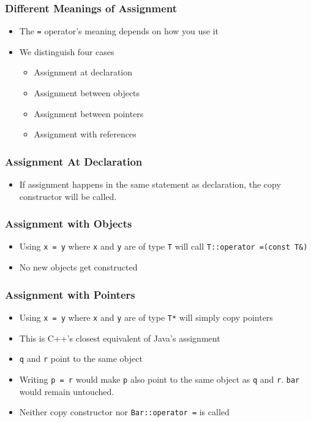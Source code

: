 \begin{frame}
  \frametitle{Different Meanings of Assignment}
  \begin{itemize}
    \item The {\tt =} operator's meaning depends on how you use it
    \item We distinguish four cases
          \begin{itemize}
            \item Assignment at declaration
            \item Assignment between objects
            \item Assignment between pointers
            \item Assignment with references
          \end{itemize}
  \end{itemize}
\end{frame}

\begin{frame}
  \frametitle{Assignment At Declaration}
  \begin{itemize}
    \item If assignment happens in the same statement as declaration,
          the copy constructor will be called.
  \end{itemize}
\end{frame}

\begin{frame}
  \frametitle{Assignment with Objects}
  \begin{itemize}
    \item Using {\tt x = y} where {\tt x} and {\tt y} are of type {\tt T}
          will call {\tt T::operator =(const T\&)}
    \item No new objects get constructed
  \end{itemize}
\end{frame}

\begin{frame}
  \frametitle{Assignment with Pointers}
  \begin{itemize}
    \item Using {\tt x = y} where {\tt x} and {\tt y} are of type {\tt T*}
          will simply copy pointers
    \item This is C++'s closest equivalent of Java's assignment
    \item {\tt q} and {\tt r} point to the same object
    \item Writing {\tt p = r} would make {\tt p} also point to the same object as {\tt q} and {\tt r}.
          {\tt bar} would remain untouched.
    \item Neither copy constructor nor {\tt Bar::operator =} is called
  \end{itemize}
\end{frame}

